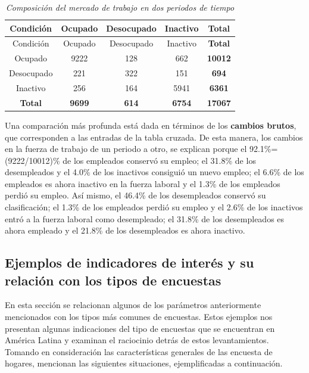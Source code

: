 \documentclass[
  10pt,
  spanish,
]{book}
\begin{document}
\begin{longtable}[]{@{}ccccc@{}}
\caption{\emph{Composición del mercado de trabajo en dos periodos de tiempo}}\tabularnewline
\toprule
Condición & Ocupado & Desocupado & Inactivo & \textbf{Total} \\
\midrule
\endfirsthead
\toprule
Condición & Ocupado & Desocupado & Inactivo & \textbf{Total} \\
\midrule
\endhead
Ocupado & 9222 & 128 & 662 & \textbf{10012} \\
Desocupado & 221 & 322 & 151 & \textbf{694} \\
Inactivo & 256 & 164 & 5941 & \textbf{6361} \\
\textbf{Total} & \textbf{9699} & \textbf{614} & \textbf{6754} & \textbf{17067} \\
\bottomrule
\end{longtable}

Una comparación más profunda está dada en términos de los \textbf{cambios brutos}, que corresponden a las entradas de la tabla cruzada. De esta manera, los cambios en la fuerza de trabajo de un periodo a otro, se explican porque el 92.1\%=(9222/10012)\% de los empleados conservó su empleo; el 31.8\% de los desempleados y el 4.0\% de los inactivos consiguió un nuevo empleo; el 6.6\% de los empleados es ahora inactivo en la fuerza laboral y el 1.3\% de los empleados perdió su empleo. Así mismo, el 46.4\% de los desempleados conservó su clasificación; el 1.3\% de los empleados perdió su empleo y el 2.6\% de los inactivos entró a la fuerza laboral como desempleado; el 31.8\% de los desempleados es ahora empleado y el 21.8\% de los desempleados es ahora inactivo.

\hypertarget{ejemplos-de-indicadores-de-interuxe9s-y-su-relaciuxf3n-con-los-tipos-de-encuestas}{%
\subsection{Ejemplos de indicadores de interés y su relación con los tipos de encuestas}\label{ejemplos-de-indicadores-de-interuxe9s-y-su-relaciuxf3n-con-los-tipos-de-encuestas}}

En esta sección se relacionan algunos de los parámetros anteriormente mencionados con los tipos más comunes de encuestas. Estos ejemplos nos presentan algunas indicaciones del tipo de encuestas que se encuentran en América Latina y examinan el raciocinio detrás de estos levantamientos. Tomando en consideración las características generales de las encuesta de hogares, \citet{Duncan_Kalton_1987} mencionan las siguientes situaciones, ejemplificadas a continuación.
\end{document}
